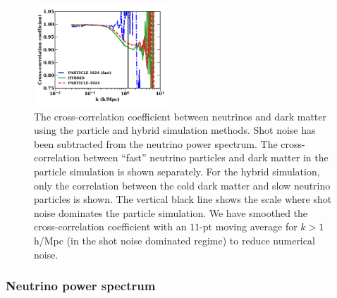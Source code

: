 \documentclass[useAMS, usenatbib]{mnras}
\begin{document}
\begin{figure}
\includegraphics[width=0.45\textwidth]{nuplots/corr_coeff-1.pdf}
  \caption{The cross-correlation coefficient between neutrinos and dark matter using the particle and hybrid simulation methods. Shot noise has been subtracted from the neutrino power spectrum. The cross-correlation between ``fast'' neutrino particles and dark matter in the particle simulation is shown separately. For the hybrid simulation, only the correlation between the cold dark matter and slow neutrino particles is shown. The vertical black line shows the scale where shot noise dominates the particle simulation.
  We have smoothed the cross-correlation coefficient with an $11$-pt moving average for $k > 1$ h/Mpc (in the shot noise dominated regime) to reduce numerical noise.
  }
  \label{fig:cross-corr}
\end{figure}


\subsubsection{Neutrino power spectrum}
\end{document}
